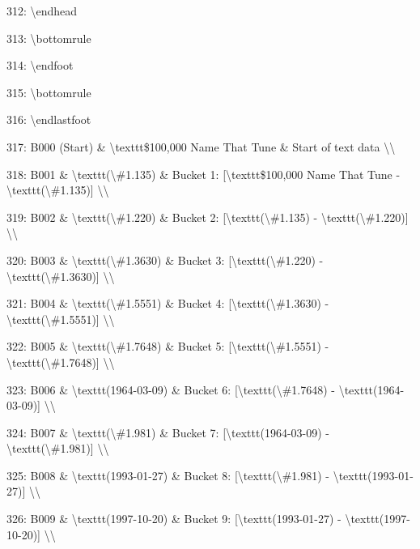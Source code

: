 \documentclass[11pt,a4paper]{article}
\begin{document}
312: \textbackslash{}endhead

313: \textbackslash{}bottomrule

314: \textbackslash{}endfoot

315: \textbackslash{}bottomrule

316: \textbackslash{}endlastfoot

317: B000 (Start) \& \textbackslash{}texttt{\$100,000 Name That Tune} \& Start of text data \textbackslash{}\textbackslash{}

318: B001 \& \textbackslash{}texttt{(\textbackslash{}\#1.135)} \& Bucket 1: [\textbackslash{}texttt{\$100,000 Name That Tune} - \textbackslash{}texttt{(\textbackslash{}\#1.135)}] \textbackslash{}\textbackslash{}

319: B002 \& \textbackslash{}texttt{(\textbackslash{}\#1.220)} \& Bucket 2: [\textbackslash{}texttt{(\textbackslash{}\#1.135)} - \textbackslash{}texttt{(\textbackslash{}\#1.220)}] \textbackslash{}\textbackslash{}

320: B003 \& \textbackslash{}texttt{(\textbackslash{}\#1.3630)} \& Bucket 3: [\textbackslash{}texttt{(\textbackslash{}\#1.220)} - \textbackslash{}texttt{(\textbackslash{}\#1.3630)}] \textbackslash{}\textbackslash{}

321: B004 \& \textbackslash{}texttt{(\textbackslash{}\#1.5551)} \& Bucket 4: [\textbackslash{}texttt{(\textbackslash{}\#1.3630)} - \textbackslash{}texttt{(\textbackslash{}\#1.5551)}] \textbackslash{}\textbackslash{}

322: B005 \& \textbackslash{}texttt{(\textbackslash{}\#1.7648)} \& Bucket 5: [\textbackslash{}texttt{(\textbackslash{}\#1.5551)} - \textbackslash{}texttt{(\textbackslash{}\#1.7648)}] \textbackslash{}\textbackslash{}

323: B006 \& \textbackslash{}texttt{(1964-03-09)} \& Bucket 6: [\textbackslash{}texttt{(\textbackslash{}\#1.7648)} - \textbackslash{}texttt{(1964-03-09)}] \textbackslash{}\textbackslash{}

324: B007 \& \textbackslash{}texttt{(\textbackslash{}\#1.981)} \& Bucket 7: [\textbackslash{}texttt{(1964-03-09)} - \textbackslash{}texttt{(\textbackslash{}\#1.981)}] \textbackslash{}\textbackslash{}

325: B008 \& \textbackslash{}texttt{(1993-01-27)} \& Bucket 8: [\textbackslash{}texttt{(\textbackslash{}\#1.981)} - \textbackslash{}texttt{(1993-01-27)}] \textbackslash{}\textbackslash{}

326: B009 \& \textbackslash{}texttt{(1997-10-20)} \& Bucket 9: [\textbackslash{}texttt{(1993-01-27)} - \textbackslash{}texttt{(1997-10-20)}] \textbackslash{}\textbackslash{}
\end{document}
